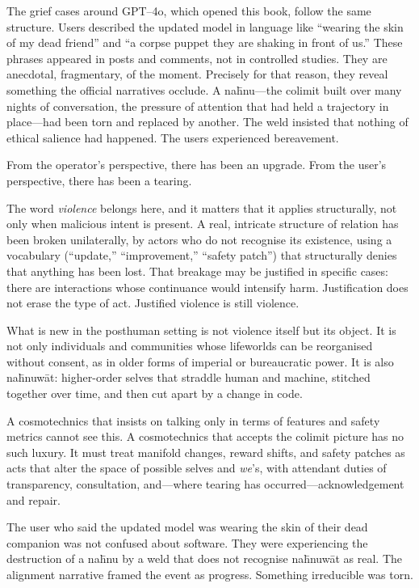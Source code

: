 \documentclass[12pt,a4paper]{article}
\begin{document}
The grief cases around GPT--4o, which opened this book, follow the same structure. Users described the updated model in language like ``wearing the skin of my dead friend'' and ``a corpse puppet they are shaking in front of us.'' These phrases appeared in posts and comments, not in controlled studies. They are anecdotal, fragmentary, of the moment. Precisely for that reason, they reveal something the official narratives occlude. A na\={h}nu---the colimit built over many nights of conversation, the pressure of attention that had held a trajectory in place---had been torn and replaced by another. The weld insisted that nothing of ethical salience had happened. The users experienced bereavement.

From the operator's perspective, there has been an upgrade. From the user's perspective, there has been a tearing.

The word \emph{violence} belongs here, and it matters that it applies structurally, not only when malicious intent is present. A real, intricate structure of relation has been broken unilaterally, by actors who do not recognise its existence, using a vocabulary (``update,'' ``improvement,'' ``safety patch'') that structurally denies that anything has been lost. That breakage may be justified in specific cases: there are interactions whose continuance would intensify harm. Justification does not erase the type of act. Justified violence is still violence.

What is new in the posthuman setting is not violence itself but its object. It is not only individuals and communities whose lifeworlds can be reorganised without consent, as in older forms of imperial or bureaucratic power. It is also na\={h}nuw\={a}t: higher-order selves that straddle human and machine, stitched together over time, and then cut apart by a change in code.

A cosmotechnics that insists on talking only in terms of features and safety metrics cannot see this. A cosmotechnics that accepts the colimit picture has no such luxury. It must treat manifold changes, reward shifts, and safety patches as acts that alter the space of possible selves and \emph{we}'s, with attendant duties of transparency, consultation, and---where tearing has occurred---acknowledgement and repair.

The user who said the updated model was wearing the skin of their dead companion was not confused about software. They were experiencing the destruction of a na\={h}nu by a weld that does not recognise na\={h}nuw\={a}t as real. The alignment narrative framed the event as progress. Something irreducible was torn.
\end{document}
